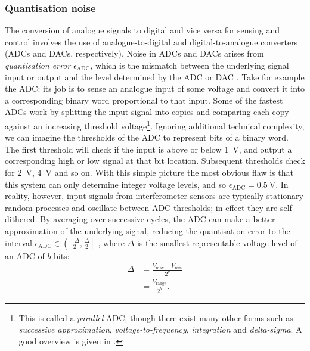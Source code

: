 \subsubsection{\label{sec:quantisation-noise}Quantisation noise}
The conversion of analogue signals to digital and vice versa for sensing and control involves the use of analogue-to-digital and digital-to-analogue converters (\glspl{ADC} and \glspl{DAC}, respectively). Noise in \glspl{ADC} and \glspl{DAC} arises from \emph{quantisation error} $\epsilon_{\text{ADC}}$, which is the mismatch between the underlying signal input or output and the level determined by the \gls{ADC} or \gls{DAC} \cite{Allen1997}. Take for example the \gls{ADC}: its job is to sense an analogue input of some voltage and convert it into a corresponding binary word proportional to that input. Some of the fastest \glspl{ADC} work by splitting the input signal into copies and comparing each copy against an increasing threshold voltage\footnote{This is called a \emph{parallel} \gls{ADC}, though there exist many other forms such as \emph{successive approximation}, \emph{voltage-to-frequency}, \emph{integration} and \emph{delta-sigma}. A good overview is given in \cite{Horowitz2015}.}. Ignoring additional technical complexity, we can imagine the thresholds of the \gls{ADC} to represent bits of a binary word. The first threshold will check if the input is above or below \SI{1}{\volt}, and output a corresponding high or low signal at that bit location. Subsequent thresholds check for \SI{2}{\volt}, \SI{4}{\volt} and so on. With this simple picture the most obvious flaw is that this system can only determine integer voltage levels, and so $\epsilon_{\text{ADC}} = \SI{0.5}{\volt}$. In reality, however, input signals from interferometer sensors are typically stationary random processes and oscillate between \gls{ADC} thresholds; in effect they are self-dithered. By averaging over successive cycles, the \gls{ADC} can make a better approximation of the underlying signal, reducing the quantisation error to the interval $\epsilon_{\text{ADC}} \in \left( \frac{-\Delta}{2}, \frac{\Delta}{2} \right]$ \cite{Allen1997}, where $\Delta$ is the smallest representable voltage level of an \gls{ADC} of $b$ bits:
\begin{equation}
  \begin{split}
    \Delta &= \frac{V_{\text{max}} - V_{\text{min}}}{2^{b}} \\
           &= \frac{V_{\text{range}}}{2^{b}}.
  \end{split}
\end{equation}

